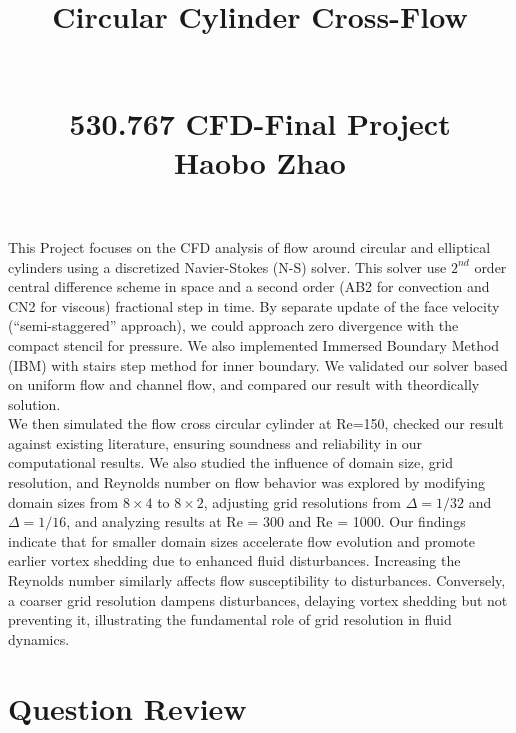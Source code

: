 \documentclass[12pt]{article}
\begin{document}
\title{\begin{Huge}Circular Cylinder Cross-Flow\end{Huge}\\530.767 CFD-Final Project\\Haobo Zhao}
\maketitle


This Project focuses on the CFD analysis of flow around circular and elliptical cylinders using a discretized Navier-Stokes (N-S) solver. This solver use $2^{nd}$ order central difference scheme in space and a second order (AB2 for convection and CN2 for viscous) fractional step in time. By separate update of the face velocity (“semi-staggered”  approach), we could approach zero divergence with the compact stencil for pressure. We also implemented Immersed Boundary Method (IBM) with stairs step method for inner boundary. We validated our solver based on uniform flow and channel flow, and compared our result with theordically solution. \\


We then simulated the flow cross circular cylinder at Re=150, checked our result against existing literature, ensuring soundness and reliability in our computational results. We also studied the influence of domain size, grid resolution, and Reynolds number on flow behavior was explored by modifying domain sizes from $8 \times 4$ to $8 \times 2$, adjusting grid resolutions from $\Delta =1/32$ and $\Delta = 1/16$, and analyzing results at Re = 300 and Re = 1000. Our findings indicate that for smaller domain sizes accelerate flow evolution and promote earlier vortex shedding due to enhanced fluid disturbances. Increasing the Reynolds number similarly affects flow susceptibility to disturbances. Conversely, a coarser grid resolution dampens disturbances, delaying vortex shedding but not preventing it, illustrating the fundamental role of grid resolution in fluid dynamics. 






\tableofcontents


\section{Question Review}
\end{document}
